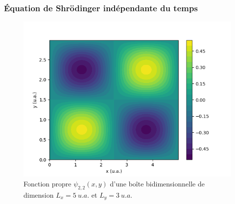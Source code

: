 \documentclass[aspectratio=169]{beamer}
\begin{document}
\begin{frame}
\frametitle{Équation de Shrödinger indépendante du temps}
\begin{figure}[h]
\includegraphics[scale=0.5]{fct_propre2d_22}
\caption{Fonction propre $\psi_{2,2}(x,y)$ d'une boîte bidimensionnelle de dimension $L_x=5\ u.a.$ et $L_y=3\ u.a.$}
\end{figure}
\end{frame}
\end{document}
